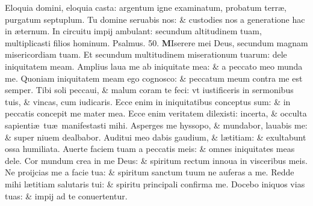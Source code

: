 \documentclass[a5paper,10pt]{book}
\def\ae{æ}
\begin{document}
\begin{multicols*}{2}
\newline \color{red} E\color{black}loquia domini, eloquia casta: argentum igne examinatum, probatum terr\ae , purgatum septuplum.
\newline \color{red} T\color{black}u domine seruabis nos: \& custodies nos a generatione hac in \ae ternum.
\newline \color{red} I\color{black}n circuitu impij ambulant: secundum altitudinem tuam, multiplicasti filios hominum. \quad \color{red} Psalmus. \hypertarget{ps50}{50.} \color{black}
\vspace{-.5em}
\lettrine[lines=2]{\bfseries \color{red} M}{}Iserere mei Deus, secundum magnam misericordiam tuam.
\newline \color{red} E\color{black}t secundum multitudinem miserationum tuarum: dele iniquitatem meam.
\newline \color{red} A\color{black}mplius laua me ab iniquitate mea: \& a peccato meo munda me.
\newline \color{red} Q\color{black}uoniam iniquitatem meam ego cognosco: \& peccatum meum contra me est semper.
\newline \color{red} T\color{black}ibi soli peccaui, \& malum coram te feci: vt iustificeris in sermonibus tuis, \& vincas, cum iudicaris.
\newline \color{red} E\color{black}cce enim in iniquitatibus conceptus sum: \& in peccatis concepit me mater mea.
\newline \color{red} E\color{black}cce enim veritatem dilexisti: incerta, \& occulta sapienti\ae \ tu\ae \ manifestasti mihi.
\newline \color{red} A\color{black}sperges me hyssopo, \& mundabor, lauabis me: \& super niuem dealbabor.
\newline \color{red} A\color{black}uditui meo dabis gaudium, \& l\ae titiam: \& exultabunt ossa humiliata.
\newline \color{red} A\color{black}uerte faciem tuam a peccatis meis: \& omnes iniquitates meas dele.
\newline \color{red} C\color{black}or mundum crea in me Deus: \& spiritum rectum innoua in visceribus meis.
\newline \color{red} N\color{black}e proijcias me a facie tua: \& spiritum sanctum tuum ne auferas a me.
\newline \color{red} R\color{black}edde mihi l\ae titiam salutaris tui: \& spiritu principali confirma me.
\newline \color{red} D\color{black}ocebo iniquos vias tuas: \& impij ad te conuertentur.

\end{multicols*}
\end{document}
